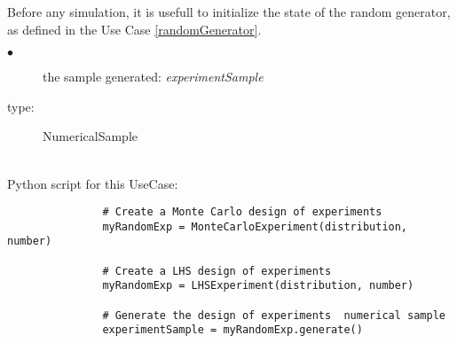 Before any simulation, it is usefull to initialize the state of the random generator, as defined in the Use Case \ref{randomGenerator}.\\

             {
               \begin{description}
               \item[$\bullet$] the sample generated: {\itshape experimentSample}
               \item[type:] NumericalSample
               \end{description}
             }

             \textspace\\
             Python script for this UseCase:

             \begin{lstlisting}
               # Create a Monte Carlo design of experiments
               myRandomExp = MonteCarloExperiment(distribution, number)

               # Create a LHS design of experiments
               myRandomExp = LHSExperiment(distribution, number)

               # Generate the design of experiments  numerical sample
               experimentSample = myRandomExp.generate()
             \end{lstlisting}
